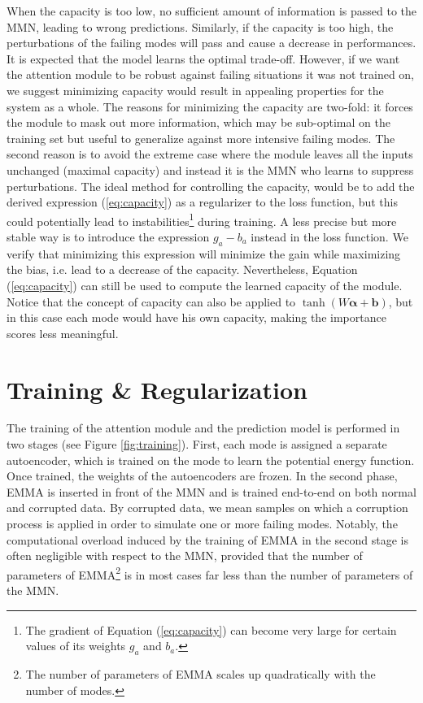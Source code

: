 When the capacity is too low, no sufficient amount of information is passed to the MMN, leading to wrong predictions. Similarly, if the capacity is too high, the perturbations of the failing modes will pass and cause a decrease in performances. It is expected that the model learns the optimal trade-off. However, if we want the attention module to be robust against failing situations it was not trained on, we suggest minimizing capacity would result in appealing properties for the system as a whole. The reasons for minimizing the capacity are two-fold: it forces the module to mask out more information, which may be sub-optimal on the training set but useful to generalize against more intensive failing modes. The second reason is to avoid the extreme case where the module leaves all the inputs unchanged (maximal capacity) and instead it is the MMN who learns to suppress perturbations. The ideal method for controlling the capacity, would be to add the derived expression (\ref{eq:capacity}) as a regularizer to the loss function, but this could potentially lead to instabilities\footnote{The gradient of Equation (\ref{eq:capacity}) can become very large for certain values of its weights $g_a$ and $b_a$.} during training. A less precise but more stable way is to introduce the expression $g_a-b_a$ instead in the loss function. We verify that minimizing this expression will minimize the gain while maximizing the bias, i.e. lead to a decrease of the capacity. Nevertheless, Equation (\ref{eq:capacity}) can still be used to compute the learned capacity of the module. Notice that the concept of capacity can also be applied to $\tanh(W\bm{\alpha}+\mathbf{b})$, but in this case each mode would have his own capacity, making the importance scores less meaningful.



\section{Training \& Regularization}\label{sec:regul}
The training of the attention module and the prediction model is performed in two stages (see Figure \ref{fig:training}). First, each mode is assigned a separate autoencoder, which is trained on the mode to learn the potential energy function. Once trained, the weights of the autoencoders are frozen. In the second phase, EMMA is inserted in front of the MMN and is trained end-to-end on both normal and corrupted data. By corrupted data, we mean samples on which a corruption process is applied in order to simulate one or more failing modes. Notably, the computational overload induced by the training of EMMA in the second stage is often negligible with respect to the MMN, provided that the number of parameters of EMMA\footnote{The number of parameters of EMMA scales up quadratically with the number of modes.} is in most cases far less than the number of parameters of the MMN. 

